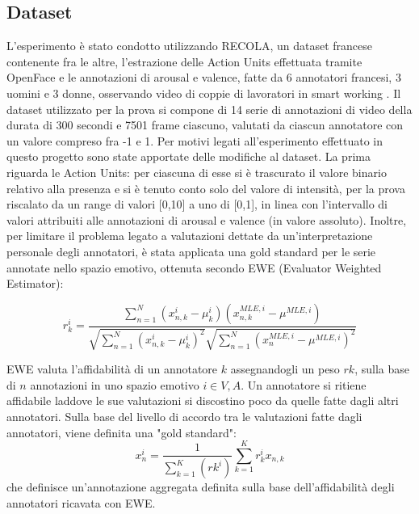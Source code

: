 \documentclass[10pt,journal,compsoc]{IEEEtran}
\begin{document}
\subsection{Dataset}
L’esperimento è stato condotto utilizzando RECOLA, un dataset francese contenente fra le altre, l'estrazione delle Action Units effettuata tramite OpenFace e le annotazioni di arousal e valence, fatte da 6 annotatori francesi, 3 uomini e 3 donne, osservando video di coppie di lavoratori in smart working \cite{recola}.
Il dataset utilizzato per la prova si compone di 14 serie di annotazioni di video della durata di 300 secondi e 7501 frame ciascuno, valutati da ciascun annotatore con un valore compreso fra -1 e 1. Per motivi legati all'esperimento effettuato in questo progetto sono state apportate delle modifiche al dataset. La prima riguarda le Action Units: per ciascuna di esse si è trascurato il valore binario relativo alla presenza e si è tenuto conto solo del valore di intensità, per la prova riscalato da un range di valori [0,10] a uno di [0,1], in linea con l'intervallo di valori attribuiti alle annotazioni di arousal e valence (in valore assoluto). Inoltre, per limitare il problema legato a valutazioni dettate da un'interpretazione personale degli annotatori, è stata applicata una gold standard per le serie annotate nello spazio emotivo, ottenuta secondo EWE (Evaluator Weighted Estimator):

\[r_k^i=\frac{\sum_{n=1}^N (x_{n,k}^i - \mu_k^i) (x_{n,k}^{MLE,i} - \mu^{MLE,i})}{ \sqrt{\sum_{n=1}^N (x_{n,k}^i - \mu_k^i)^2 }\sqrt{\sum_{n=1}^N (x_{n}^{MLE,i} - \mu^{MLE,i})^2 }}\tag{20}\]

EWE valuta l’affidabilità di un annotatore \(k\) assegnandogli un peso \(rk\), sulla base di \(n\) annotazioni in uno spazio emotivo \(i \in {V,A}\). Un annotatore si ritiene affidabile laddove le sue valutazioni si discostino poco da quelle fatte dagli altri annotatori.\cite{ewe}
Sulla base del livello di accordo tra le valutazioni fatte dagli annotatori, viene definita una "gold standard":
\[x_n^i=\frac{1}{\sum_{k=1}^K(r{k}^i)}{\sum_{k=1}^Kr_k^ix_{n,k}}\tag{21}\]
che definisce un'annotazione aggregata definita sulla base dell'affidabilità degli annotatori ricavata con EWE.
\end{document}
